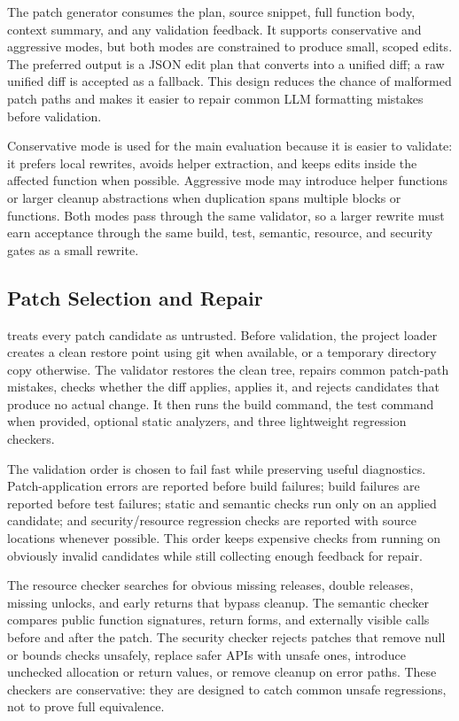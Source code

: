 The patch generator consumes the plan, source snippet, full function body,
context summary, and any validation feedback. It supports conservative and
aggressive modes, but both modes are constrained to produce small, scoped edits.
The preferred output is a JSON edit plan that \SysName{} converts into a
unified diff; a raw unified diff is accepted as a fallback. This design reduces
the chance of malformed patch paths and makes it easier to repair common LLM
formatting mistakes before validation.

Conservative mode is used for the main evaluation because it is easier to
validate: it prefers local rewrites, avoids helper extraction, and keeps edits
inside the affected function when possible. Aggressive mode may introduce helper
functions or larger cleanup abstractions when duplication spans multiple blocks
or functions. Both modes pass through the same validator, so a larger rewrite
must earn acceptance through the same build, test, semantic, resource, and
security gates as a small rewrite.

\subsection{Patch Selection and Repair}
\label{sec:design-validation}

\SysName{} treats every patch candidate as untrusted. Before validation, the
project loader creates a clean restore point using git when available, or a
temporary directory copy otherwise. The validator restores the clean tree,
repairs common patch-path mistakes, checks whether the diff applies, applies it,
and rejects candidates that produce no actual change. It then runs the build
command, the test command when provided, optional static analyzers, and three
lightweight regression checkers.

The validation order is chosen to fail fast while preserving useful diagnostics.
Patch-application errors are reported before build failures; build failures are
reported before test failures; static and semantic checks run only on an applied
candidate; and security/resource regression checks are reported with source
locations whenever possible. This order keeps expensive checks from running on
obviously invalid candidates while still collecting enough feedback for repair.

The resource checker searches for obvious missing releases, double releases,
missing unlocks, and early returns that bypass cleanup. The semantic checker
compares public function signatures, return forms, and externally visible calls
before and after the patch. The security checker rejects patches that remove
null or bounds checks unsafely, replace safer APIs with unsafe ones, introduce
unchecked allocation or return values, or remove cleanup on error paths. These
checkers are conservative: they are designed to catch common unsafe regressions,
not to prove full equivalence.


